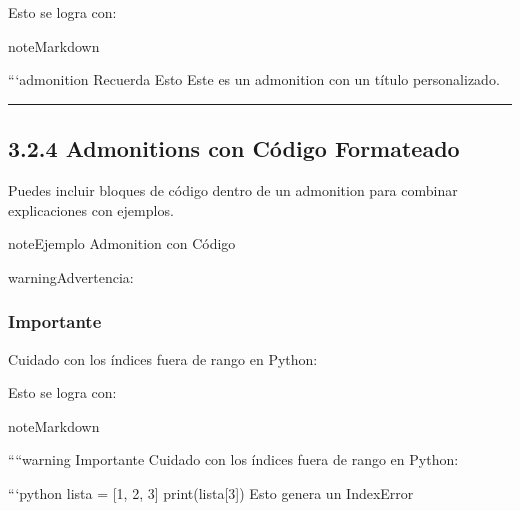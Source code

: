 \documentclass[a4paper,10pt,spanish]{sphinxmanual}
\begin{document}
\sphinxAtStartPar
Esto se logra con:

\begin{sphinxadmonition}{note}{Markdown}

\begin{sphinxVerbatim}[commandchars=\\\{\}]
```\PYGZob{}admonition\PYGZcb{} Recuerda Esto
Este es un admonition con un título personalizado.
\end{sphinxVerbatim}
\end{sphinxadmonition}


\bigskip\hrule\bigskip



\subsection{3.2.4 Admonitions con Código Formateado}
\label{\detokenize{3_guia_myst/advertencias:admonitions-con-codigo-formateado}}
\sphinxAtStartPar
Puedes incluir bloques de código dentro de un admonition para combinar explicaciones con ejemplos.

\begin{sphinxadmonition}{note}{Ejemplo Admonition con Código}

\begin{sphinxadmonition}{warning}{Advertencia:}\subsubsection*{Importante}

\sphinxAtStartPar
Cuidado con los índices fuera de rango en Python:

\begin{sphinxVerbatim}[commandchars=\\\{\}]
  \PYG{p}{[}  \PYG{p}{]}
\PYG{p}{[}\PYG{p}{]}  
\end{sphinxVerbatim}
\end{sphinxadmonition}
\end{sphinxadmonition}

\sphinxAtStartPar
Esto se logra con:

\begin{sphinxadmonition}{note}{Markdown}

\begin{sphinxVerbatim}[commandchars=\\\{\}]
````\PYGZob{}warning\PYGZcb{}
\PYGZsh{}\PYGZsh{}\PYGZsh{} Importante
Cuidado con los índices fuera de rango en Python:

```python
lista = [1, 2, 3]
print(lista[3])  \PYGZsh{} Esto genera un IndexError
\end{sphinxVerbatim}
\end{sphinxadmonition}
\end{document}
